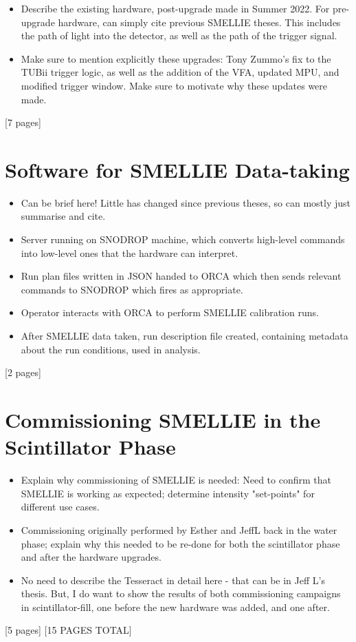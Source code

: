 \begin{figure}
    \centering
    \caption[]{}
    \label{fig:pq_new_intensity_dependence}
\end{figure}

{
\color{blue}
\begin{itemize}
    \item Describe the existing hardware, post-upgrade made in Summer 2022. For pre-upgrade hardware, can simply cite previous SMELLIE theses. This includes the path of light into the detector, as well as the path of the trigger signal.
    \item Make sure to mention explicitly these upgrades: Tony Zummo's fix to the TUBii trigger logic, as well as the addition of the VFA, updated MPU, and modified trigger window. Make sure to motivate why these updates were made.
\end{itemize}
[7 pages]
\section{Software for SMELLIE Data-taking}
\begin{itemize}
    \item Can be brief here! Little has changed since previous theses, so can mostly just summarise and cite.
    \item Server running on SNODROP machine, which converts high-level commands into low-level ones that the hardware can interpret.
    \item Run plan files written in JSON handed to ORCA which then sends relevant commands to SNODROP which fires as appropriate.
    \item Operator interacts with ORCA to perform SMELLIE calibration runs.
    \item After SMELLIE data taken, run description file created, containing metadata about the run conditions, used in analysis.
\end{itemize}
[2 pages]
\section[Commissioning SMELLIE in the Scintillator Phase]{Commissioning SMELLIE in the\\ Scintillator Phase}
\begin{itemize}
    \item Explain why commissioning of SMELLIE is needed: Need to confirm that SMELLIE is working as expected; determine intensity "set-points" for different use cases.
    \item Commissioning originally performed by Esther and JeffL back in the water phase; explain why this needed to be re-done for both the scintillator phase and after the hardware upgrades.
    \item No need to describe the Tesseract in detail here - that can be in Jeff L's thesis. But, I do want to show the results of both commissioning campaigns in scintillator-fill, one before the new hardware was added, and one after.
\end{itemize}
[5 pages]
[15 PAGES TOTAL]
}